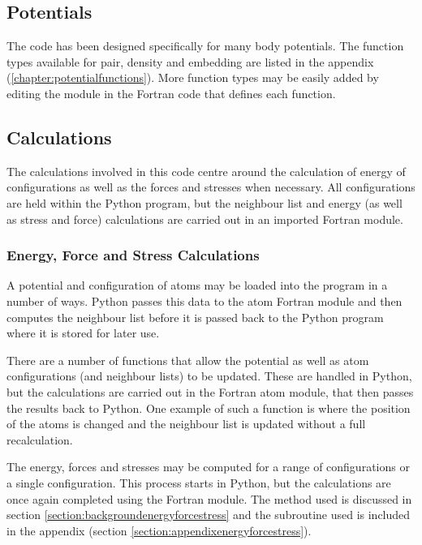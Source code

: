 \subsection{Potentials}

The code has been designed specifically for many body potentials.  The function types available for pair, density and embedding are listed in the appendix (\ref{chapter:potentialfunctions}).  More function types may be easily added by editing the module in the Fortran code that defines each function.





\subsection{Calculations}

The calculations involved in this code centre around the calculation of energy of configurations as well as the forces and stresses when necessary.  All configurations are held within the Python program, but the neighbour list and energy (as well as stress and force) calculations are carried out in an imported Fortran module.

\subsubsection{Energy, Force and Stress Calculations}

A potential and configuration of atoms may be loaded into the program in a number of ways.  Python passes this data to the atom Fortran module and then computes the neighbour list before it is passed back to the Python program where it is stored for later use.

There are a number of functions that allow the potential as well as atom configurations (and neighbour lists) to be updated.  These are handled in Python, but the calculations are carried out in the Fortran atom module, that then passes the results back to Python.  One example of such a function is where the position of the atoms is changed and the neighbour list is updated without a full recalculation.

The energy, forces and stresses may be computed for a range of configurations or a single configuration.  This process starts in Python, but the calculations are once again completed using the Fortran module.  The method used is discussed in section \ref{section:backgroundenergyforcestress} and the subroutine used is included in the appendix (section \ref{section:appendixenergyforcestress}).


